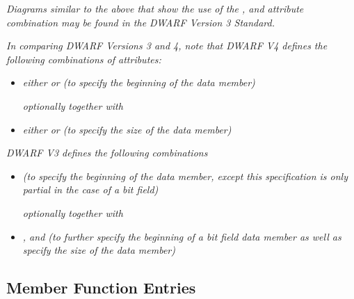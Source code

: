 \textit{Diagrams similar to the above that show the use of the
,  and  attribute
combination may be found in the DWARF Version 3 Standard.}

\textit{In comparing DWARF Versions 3 and 4, note that DWARF V4
defines the following combinations of attributes:}

\begin{itemize}
\item \textit{either  or
 (to specify the beginning of the
data member)}

\textit{optionally together with}

\item  \textit{either  or  (to
specify the size of the data member)}

\end{itemize}

\textit{DWARF V3 defines the following combinations}

\begin{itemize}
\item \textit{ (to specify the beginning
of the data member, except this specification is only partial
in the case of a bit field) }

\textit{optionally together with}

\item \textit{,  and 
(to further specify the beginning of a bit field data member
as well as specify the size of the data member) }
\end{itemize}

\subsection{Member Function Entries}
\label{chap:memberfunctionentries}

